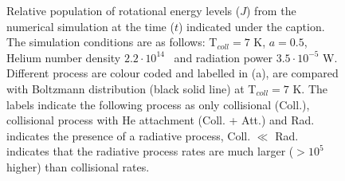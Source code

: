 \begin{figure}[!htb]
    \hfill
    \caption{Relative population of rotational energy levels ($J$) from the numerical simulation at the time ($t$) indicated under the caption. The simulation conditions are as follows: T$_{coll}=7$ K, $a=0.5$, Helium number density $2.2 \cdot 10^{14}$ \percc\ and radiation power $3.5\cdot10^{-5}$ W. Different process are colour coded and labelled in (a), are compared with Boltzmann distribution (black solid line) at T$_{coll}=7$ K.  The labels indicate the following process as only collisional (Coll.), collisional process with He attachment (Coll. + Att.) and Rad. indicates the presence of a radiative process, Coll. $\ll$ Rad. indicates that the radiative process rates are much larger ($>10^{5}$ higher) than collisional rates.}
    \label{fig:thz-sim:boltzman-comparision}
\end{figure}